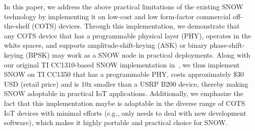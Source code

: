 In this paper, we address the above practical limitations of the existing SNOW technology by implementing it on low-cost and low form-factor commercial off-the-shelf (COTS) devices.
Through this implementation, we demonstrate that any COTS device that has a programmable physical layer (PHY), operates in the white spaces, and supports amplitude-shift-keying (ASK) or binary phase-shift-keying (BPSK) may work as a SNOW node in practical deployments. Along with our original TI CC1310-based SNOW implementation in~\cite{snow_cots}, we thus implement SNOW on TI CC1350 that has a programmable PHY, costs approximately \$30 USD (retail price) and is 10x smaller than a USRP B200 device, thereby making SNOW adoptable in practical IoT applications. Additionally, we emphasize the fact that this implementation maybe is adaptable in the diverse range of COTS IoT devices with minimal efforts (e.g., only needs to deal with new development software), which makes it highly portable and practical choice for SNOW.















